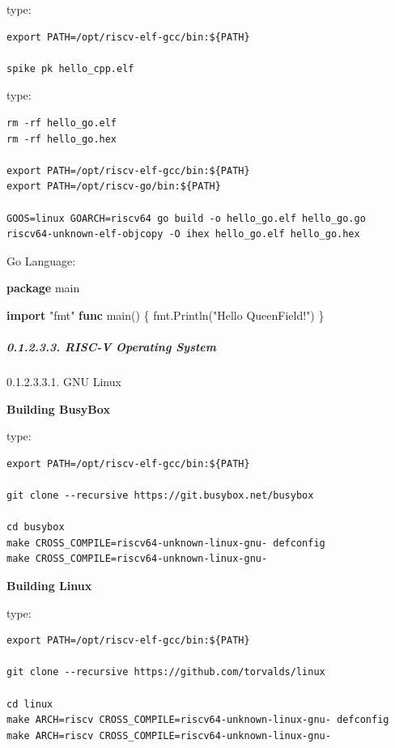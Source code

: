 \documentclass[
]{article}
\newenvironment{Shaded}{}{}
\newcommand{\KeywordTok}[1]{\textcolor[rgb]{0.00,0.44,0.13}{\textbf{#1}}}
\newcommand{\NormalTok}[1]{#1}
\newcommand{\StringTok}[1]{\textcolor[rgb]{0.25,0.44,0.63}{#1}}
\begin{document}
type:

\begin{verbatim}
export PATH=/opt/riscv-elf-gcc/bin:${PATH}

spike pk hello_cpp.elf
\end{verbatim}

type:

\begin{verbatim}
rm -rf hello_go.elf
rm -rf hello_go.hex

export PATH=/opt/riscv-elf-gcc/bin:${PATH}
export PATH=/opt/riscv-go/bin:${PATH}

GOOS=linux GOARCH=riscv64 go build -o hello_go.elf hello_go.go
riscv64-unknown-elf-objcopy -O ihex hello_go.elf hello_go.hex
\end{verbatim}

Go Language:

\begin{Shaded}
\begin{Highlighting}[]
\KeywordTok{package}\NormalTok{ main}

\KeywordTok{import} \StringTok{"fmt"}
\KeywordTok{func}\NormalTok{ main() \{}
\NormalTok{  fmt.Println(}\StringTok{"Hello QueenField!"}\NormalTok{)}
\NormalTok{\}}
\end{Highlighting}
\end{Shaded}

\hypertarget{risc-v-operating-system}{%
\subparagraph{0.1.2.3.3. RISC-V Operating
System}\label{risc-v-operating-system}}

0.1.2.3.3.1. GNU Linux

\textbf{Building BusyBox}

type:

\begin{verbatim}
export PATH=/opt/riscv-elf-gcc/bin:${PATH}

git clone --recursive https://git.busybox.net/busybox

cd busybox
make CROSS_COMPILE=riscv64-unknown-linux-gnu- defconfig
make CROSS_COMPILE=riscv64-unknown-linux-gnu-
\end{verbatim}

\textbf{Building Linux}

type:

\begin{verbatim}
export PATH=/opt/riscv-elf-gcc/bin:${PATH}

git clone --recursive https://github.com/torvalds/linux

cd linux
make ARCH=riscv CROSS_COMPILE=riscv64-unknown-linux-gnu- defconfig
make ARCH=riscv CROSS_COMPILE=riscv64-unknown-linux-gnu-
\end{verbatim}
\end{document}
